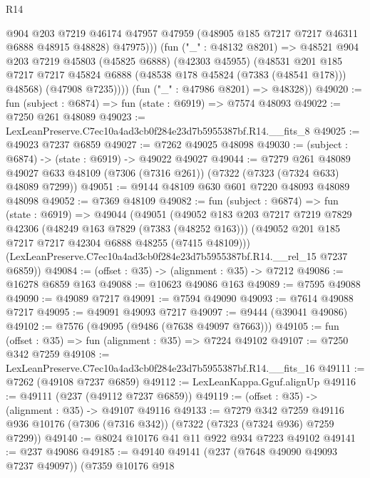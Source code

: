 \begin{lexlean}{R14}
\begin{coremodule}
                @904
                @203
                @7219
                @46174
                @47957
                @47959
                (@48905 @185 @7217 @7217 @46311 @6888 @48915 @48828)
                @47975)))
          (fun ("_" : @48132 @8201) =>
          @48521
            @904
            @203
            @7219
            @45803
            (@45825 @6888)
            (@42303 @45955)
            (@48531
              @201
              @185
              @7217
              @7217
              @45824
              @6888
              (@48538 @178 @45824 (@7383 (@48541 @178)))
              @48568)
            (@47908 @7235))))
      (fun ("_" : @47986 @8201) => @48328))
@49020 := fun (subject : @6874) => fun (state : @6919) => @7574 @48093
@49022 := @7250 @261 @48089
@49023 := LexLeanPreserve.C7ec10a4ad3cb0f284e23d7b5955387bf.R14.__fits_8
@49025 := @49023 @7237 @6859
@49027 := @7262 @49025 @48098
@49030 := (subject : @6874) -> (state : @6919) -> @49022 @49027
@49044 := @7279
    @261
    @48089
    @49027
    @633
    @48109
    (@7306 (@7316 @261))
    (@7322 (@7323 (@7324 @633) @48089 @7299))
@49051 := @9144 @48109 @630 @601 @7220 @48093 @48089 @48098
@49052 := @7369 @48109
@49082 := fun (subject : @6874) =>
  fun (state : @6919) =>
  @49044
    (@49051
      (@49052
        @183
        @203
        @7217
        @7219
        @7829
        @42306
        (@48249 @163 @7829 (@7383 (@48252 @163)))
        (@49052 @201 @185 @7217 @7217 @42304 @6888 @48255 (@7415 @48109)))
      (LexLeanPreserve.C7ec10a4ad3cb0f284e23d7b5955387bf.R14.__rel_15 @7237 @6859))
@49084 := (offset : @35) -> (alignment : @35) -> @7212
@49086 := @16278 @6859 @163
@49088 := @10623 @49086 @163
@49089 := @7595 @49088
@49090 := @49089 @7217
@49091 := @7594 @49090
@49093 := @7614 @49088 @7217
@49095 := @49091 @49093 @7217
@49097 := @9444 (@39041 @49086)
@49102 := @7576 (@49095 (@9486 (@7638 @49097 @7663)))
@49105 := fun (offset : @35) => fun (alignment : @35) => @7224 @49102
@49107 := @7250 @342 @7259
@49108 := LexLeanPreserve.C7ec10a4ad3cb0f284e23d7b5955387bf.R14.__fits_16
@49111 := @7262 (@49108 @7237 @6859)
@49112 := LexLeanKappa.Gguf.alignUp
@49116 := @49111 (@237 (@49112 @7237 @6859))
@49119 := (offset : @35) -> (alignment : @35) -> @49107 @49116
@49133 := @7279
    @342
    @7259
    @49116
    @936
    @10176
    (@7306 (@7316 @342))
    (@7322 (@7323 (@7324 @936) @7259 @7299))
@49140 := @8024 @10176 @41 @11 @922 @934 @7223 @49102
@49141 := @237 @49086
@49185 := @49140
    @49141
    (@237 (@7648 @49090 @49093 @7237 @49097))
    (@7359
      @10176
      @918

\end{coremodule}
\end{lexlean}
